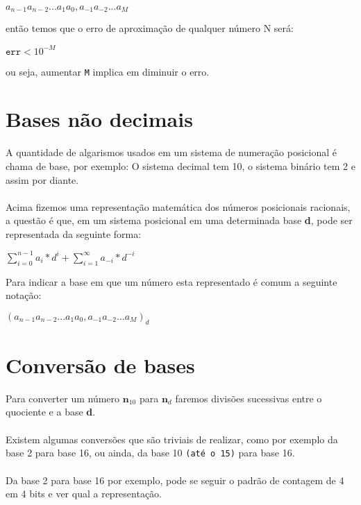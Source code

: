 \documentclass[12pt, onecolumn]{article}
\begin{document}
	\begin{center}
		$a_{n-1} a_{n-2} ... a_{1} a_{0}, a_{-1} a_{-2} ... a_{M}$
	\end{center}

	então temos que o erro de aproximação de qualquer número N será:

	\begin{center}
		$\texttt{err} < 10^{-M}$
	\end{center}
	
	ou seja, aumentar \texttt{M} implica em diminuir o erro.
	
	\section{Bases não decimais}
	A quantidade de algarismos usados em um sistema de numeração posicional é
	chama de base, por exemplo: O sistema decimal tem 10, o sistema binário tem 2 e 
	assim por diante.\\
	\\
	Acima fizemos uma representação matemática dos números posicionais 
	racionais, a questão é que, em um sistema posicional em uma determinada
	base \textbf{d}, pode ser representada da seguinte forma: 

	\begin{center}
		$\sum_{i=0}^{n-1} a_{i} * d^{i} + 
		\sum_{i=1}^{\infty} a_{-i} * d^{-i}$
	\end{center}

	Para indicar a base em que um número esta representado é comum a 
	seguinte notação:

	\begin{center}
		$(a_{n-1} a_{n-2} ... a_{1} a_{0}, a_{-1} a_{-2} ... a_{M})_d$
	\end{center}

	\section{Conversão de bases}
	Para converter um número $\textbf{n}_{10}$ para $\textbf{n}_{d}$ faremos
	divisões sucessivas entre o quociente e a base \textbf{d}.\\
	\\
	Existem algumas conversões que são triviais de realizar, como por exemplo
	da base 2 para base 16, ou ainda, da base 10 \texttt{(até o 15)} 
	para base 16.\\
	\\
	Da base 2 para base 16 por exemplo, pode se seguir o padrão de contagem 
	de 4 em 4 bits e ver qual a representação.
	
\end{document}
